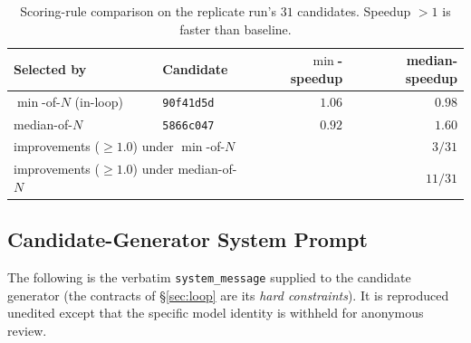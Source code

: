 \documentclass{article}
\begin{document}
\begin{table}[h]
  \caption{Scoring-rule comparison on the replicate run's $31$
    candidates. Speedup $>1$ is faster than baseline.}
  \label{tab:reranking}
  \centering
  \small
  \begin{tabular}{llrr}
    \toprule
    Selected by & Candidate & $\min$-speedup & median-speedup \\
    \midrule
    $\min$-of-$N$ (in-loop) & \texttt{90f41d5d} & $1.06$ & $0.98$ \\
    median-of-$N$           & \texttt{5866c047} & $0.92$ & $1.60$ \\
    \midrule
    \multicolumn{2}{l}{improvements ($\ge 1.0$) under $\min$-of-$N$} & \multicolumn{2}{r}{$3/31$} \\
    \multicolumn{2}{l}{improvements ($\ge 1.0$) under median-of-$N$} & \multicolumn{2}{r}{$11/31$} \\
    \bottomrule
  \end{tabular}
\end{table}

\subsection{Candidate-Generator System Prompt}
\label{app:system-prompt}
The following is the verbatim \texttt{system\_message} supplied to the
candidate generator (the contracts of \S\ref{sec:loop} are its
\emph{hard constraints}). It is reproduced unedited except that the
specific model identity is withheld for anonymous review.
\end{document}
